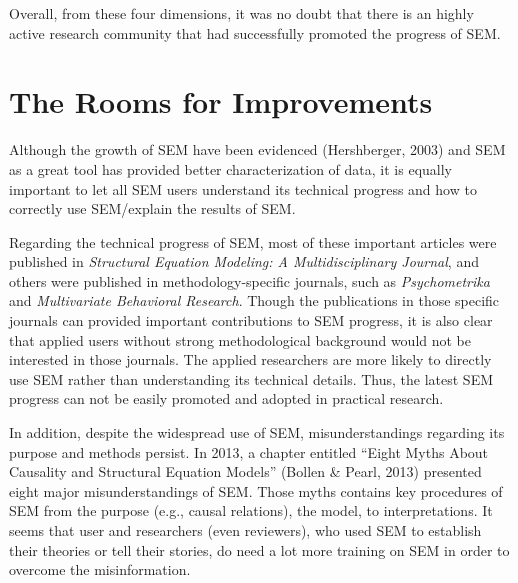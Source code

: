 \documentclass[jou]{apa6}
\theoremstyle{definition}
\theoremstyle{definition}
\theoremstyle{definition}
\theoremstyle{remark}
\begin{document}
Overall, from these four dimensions, it was no doubt that there is an
highly active research community that had successfully promoted the
progress of SEM.

\hypertarget{the-rooms-for-improvements}{%
\section{The Rooms for Improvements}\label{the-rooms-for-improvements}}

\noindent Although the growth of SEM have been evidenced (Hershberger,
2003) and SEM as a great tool has provided better characterization of
data, it is equally important to let all SEM users understand its
technical progress and how to correctly use SEM/explain the results of
SEM.

Regarding the technical progress of SEM, most of these important
articles were published in \emph{Structural Equation Modeling: A
Multidisciplinary Journal}, and others were published in
methodology-specific journals, such as \emph{Psychometrika} and
\emph{Multivariate Behavioral Research}. Though the publications in
those specific journals can provided important contributions to SEM
progress, it is also clear that applied users without strong
methodological background would not be interested in those journals. The
applied researchers are more likely to directly use SEM rather than
understanding its technical details. Thus, the latest SEM progress can
not be easily promoted and adopted in practical research.

In addition, despite the widespread use of SEM, misunderstandings
regarding its purpose and methods persist. In 2013, a chapter entitled
\enquote{Eight Myths About Causality and Structural Equation Models}
(Bollen \& Pearl, 2013) presented eight major misunderstandings of SEM.
Those myths contains key procedures of SEM from the purpose (e.g.,
causal relations), the model, to interpretations. It seems that user and
researchers (even reviewers), who used SEM to establish their theories
or tell their stories, do need a lot more training on SEM in order to
overcome the misinformation.
\end{document}
